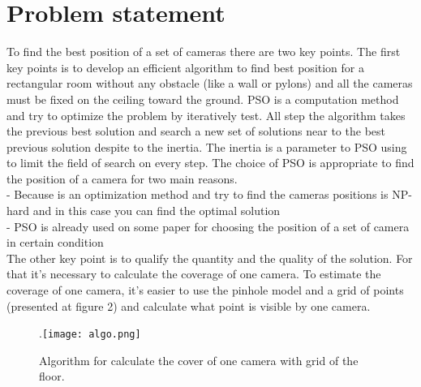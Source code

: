 
\graphicspath{ {./content/rel/figure/} }

\section{Problem statement}\label{sec:2}

 To find the best position of a set of cameras there are two key points.
The first key points is to develop an efficient algorithm to find best position for a rectangular room without any obstacle (like a wall or pylons) and all the cameras must be fixed on the ceiling toward the ground.
 	PSO is a computation method and try to optimize the problem by iteratively test. All step the algorithm takes the previous best solution and search a new set of solutions near to the best previous solution despite to the inertia. The inertia is a parameter to PSO using to limit the field of search on every step. 
The choice of PSO is appropriate to find the position of a camera for two main reasons.\\

-	Because is an optimization method and try to find the cameras positions is NP-hard and in this case you can find the optimal solution\\
-	PSO is already used on some paper for choosing the position of a set of camera  in certain condition \cite{zhou2011optimal,reddy2012camera}\\

The other key point is to qualify the quantity and the quality of the solution. For that it’s necessary to calculate the coverage of one camera. To estimate the coverage of one camera, it’s easier to use the pinhole model and a grid of points (presented at figure 2) and calculate what point is visible by one camera.

\begin{figure}
  \centering
  \hspace*{\fill}
	.\texttt{[image: algo.png]}
  \hspace*{\fill}
  \caption{%
	Algorithm for calculate the cover of one camera with grid of the floor.}
  \label{fig:422}
\end{figure}

